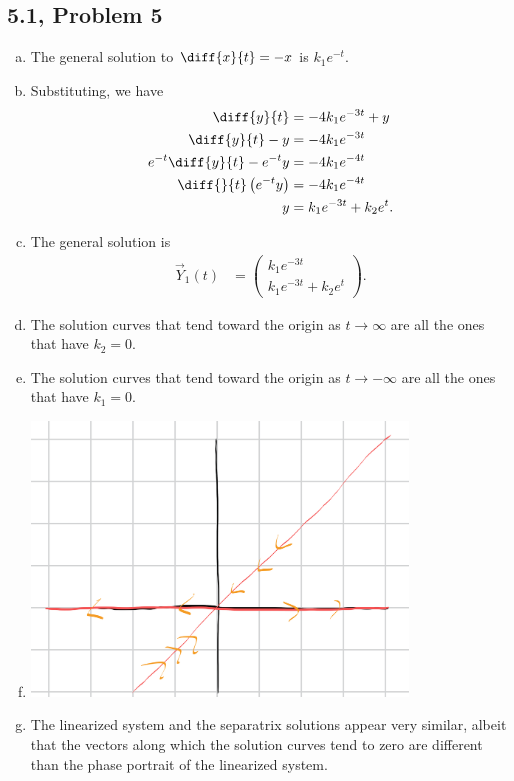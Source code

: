 \documentclass[10pt]{mypackage}
\begin{document}
\subsection{5.1, Problem 5}%
\begin{enumerate}[(a)]
  \item The general solution to $\diff{x}{t} = -x$ is $k_1e^{-t}$.
  \item Substituting, we have
    \begin{align*}
      \diff{y}{t} &= -4k_1e^{-3t} + y\\
      \diff{y}{t} - y &= -4k_1e^{-3t}\\
      e^{-t}\diff{y}{t} - e^{-t}y &= -4k_1e^{-4t}\\
      \diff{}{t}\left(e^{-t}y\right) &= -4k_1e^{-4t}\\
      y &= k_1e^{-3t} + k_2e^{t}.
    \end{align*}
  \item The general solution is
    \begin{align*}
      \vec{Y}_1(t) &= \begin{pmatrix}k_1e^{-3t} \\ k_1e^{-3t} + k_2e^{t}\end{pmatrix}.
    \end{align*}
  \item The solution curves that tend toward the origin as $t\rightarrow\infty$ are all the ones that have $k_2 = 0$.
  \item The solution curves that tend toward the origin as $t\rightarrow -\infty$ are all the ones that have $k_1 = 0$.
  \item 
    \begin{center}
      \includegraphics[width=10cm]{images/5_1_5f.png}
    \end{center}
  \item The linearized system and the separatrix solutions appear very similar, albeit that the vectors along which the solution curves tend to zero are different than the phase portrait of the linearized system.
\end{enumerate}
\end{document}

